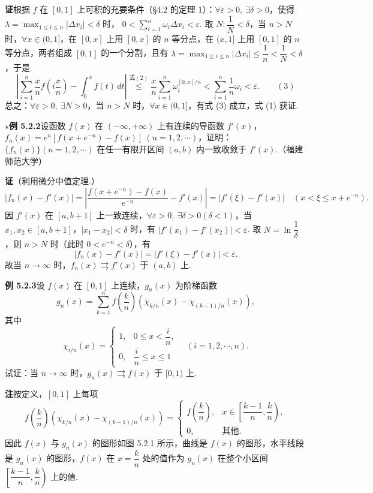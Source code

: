 \documentclass[UTF8, 12pt, fontset=fandol, oneside]{ctexart}
\begin{document}
\noindent\textbf{证}\quad 根据 $f$ 在 $[0,1]$ 上可积的充要条件（§4.2 的定理 1）：$\forall\varepsilon>0,\ \exists\delta>0$，使得
$\lambda=\max_{1\le i\le n}|\Delta x_i|<\delta$ 时，
$0<\sum_{i=1}^n\omega_i\Delta x_i<\varepsilon$. 取 $N:\dfrac1N<\delta$，当
$n>N$ 时，$\forall x\in(0,1]$，在 $[0,x]$ 上用 $[0,x]$ 的 $n$ 等分点，在
$(x,1]$ 上用 $[0,1]$ 的 $n$ 等分点，两者组成 $[0,1]$ 的一个分割，且有
$\lambda=\max_{1\le i\le n}|\Delta x_i|\le\dfrac1n<\dfrac1N<\delta$，于是
\[
  \left|\sum_{i=1}^n\frac{x}{n}f\left(i\frac{x}{n}\right)-\int_0^xf(t)\,dt\right|
  \stackrel{\text{式}(2)}{\le}
  \frac{x}{n}\sum_{i=1}^n\omega_i^{[0,x]/n}
  <\sum_{i=1}^n\frac1n\omega_i<\varepsilon.
\qquad(3)
\]
总之：$\forall\varepsilon>0,\ \exists N>0$，当 $n>N$ 时，$\forall x\in(0,1]$，有式 (3) 成立，式 (1) 获证.

\noindent\textbf{$\star$例 5.2.2}\quad 设函数 $f(x)$ 在 $(-\infty,+\infty)$ 上有连续的导函数
$f'(x)$，$f_n(x)=e^n[f(x+e^{-n})-f(x)]\ (n=1,2,\cdots)$，证明：
$\{f_n(x)\}(n=1,2,\cdots)$ 在任一有限开区间 $(a,b)$ 内一致收敛于 $f'(x)$.（福建师范大学）

\noindent\textbf{证}\quad （利用微分中值定理.）
\[
  |f_n(x)-f'(x)|
  =\left|\frac{f(x+e^{-n})-f(x)}{e^{-n}}-f'(x)\right|
  =|f'(\xi)-f'(x)|\quad(x<\xi\le x+e^{-n}).
\]
因 $f'(x)$ 在 $[a,b+1]$ 上一致连续，$\forall\varepsilon>0,\ \exists\delta>0(\delta<1)$，当
$x_1,x_2\in[a,b+1]$，$|x_1-x_2|<\delta$ 时，有
$|f'(x_1)-f'(x_2)|<\varepsilon$. 取 $N=\ln\dfrac1\delta$，则 $n>N$ 时（此时
$0<e^{-n}<\delta$），有
\[
  |f_n(x)-f'(x)|=|f'(\xi)-f'(x)|<\varepsilon.
\]
故当 $n\to\infty$ 时，$f_n(x)\rightrightarrows f'(x)$ 于 $(a,b)$ 上.

\noindent\textbf{例 5.2.3}\quad 设 $f(x)$ 在 $[0,1]$ 上连续，$g_n(x)$ 为阶梯函数
\[
  g_n(x)=\sum_{k=1}^n f\left(\frac{k}{n}\right)\left(\chi_{k/n}(x)-\chi_{(k-1)/n}(x)\right),
\]
其中
\[
  \chi_{i/n}(x)=
  \begin{cases}
  1, & 0\le x<\dfrac{i}{n},\\
  0, & \dfrac{i}{n}\le x\le1
  \end{cases}
  \quad(i=1,2,\cdots,n).
\]
试证：当 $n\to\infty$ 时，$g_n(x)\rightrightarrows f(x)$ 于 $[0,1)$ 上.

\noindent\textbf{注}\quad 按定义，$[0,1]$ 上每项
\[
  f\left(\frac{k}{n}\right)\left(\chi_{k/n}(x)-\chi_{(k-1)/n}(x)\right)
  =
  \begin{cases}
  f\left(\dfrac{k}{n}\right), & x\in\left[\dfrac{k-1}{n},\dfrac{k}{n}\right),\\
  0, & \text{其他}.
  \end{cases}
\]
因此 $f(x)$ 与 $g_n(x)$ 的图形如图 5.2.1 所示，曲线是 $f(x)$ 的图形，水平线段是
$g_n(x)$ 的图形，$f(x)$ 在 $x=\dfrac{k}{n}$ 处的值作为
$g_n(x)$ 在整个小区间 $\left[\dfrac{k-1}{n},\dfrac{k}{n}\right)$ 上的值.
\end{document}
